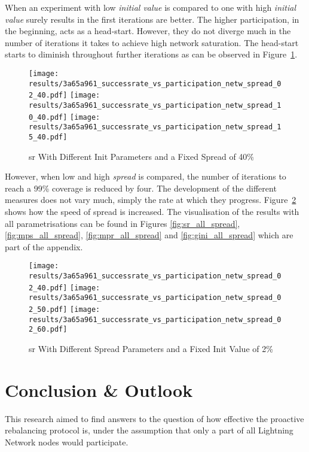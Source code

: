 \documentclass[final]{fhnwreport}       %
\begin{document}
When an experiment with low \emph{initial value} is compared to one with high \emph{initial value} surely results in the first iterations are better. The higher participation, in the beginning, acts as a head-start. However, they do not diverge much in the number of iterations it takes to achieve high network saturation. The head-start starts to diminish throughout further iterations as can be observed in Figure~\ref{fig:fix_spread}.

\begin{figure}[htp]
\centering
  \texttt{[image: results/3a65a961\_successrate\_vs\_participation\_netw\_spread\_02\_40.pdf]} 
  \texttt{[image: results/3a65a961\_successrate\_vs\_participation\_netw\_spread\_10\_40.pdf]} 
  \texttt{[image: results/3a65a961\_successrate\_vs\_participation\_netw\_spread\_15\_40.pdf]}
\caption{\gls{sr} With Different Init Parameters and a Fixed Spread of 40\%}
\label{fig:fix_spread}
\end{figure}

However, when low and high \emph{spread} is compared, the number of iterations to reach a 99\% coverage is reduced by four. The development of the different measures does not vary much, simply the rate at which they progress. Figure~\ref{fig:fix_init} shows how the speed of spread is increased. The visualisation of the results with all parametrisations can be found in Figures \ref{fig:sr_all_spread}, \ref{fig:mps_all_spread}, \ref{fig:mpr_all_spread} and \ref{fig:gini_all_spread} which are part of the appendix.


\newpage
\begin{figure}[htp]
\centering
  \texttt{[image: results/3a65a961\_successrate\_vs\_participation\_netw\_spread\_02\_40.pdf]} 
  \texttt{[image: results/3a65a961\_successrate\_vs\_participation\_netw\_spread\_02\_50.pdf]} 
  \texttt{[image: results/3a65a961\_successrate\_vs\_participation\_netw\_spread\_02\_60.pdf]}
\caption{\gls{sr} With Different Spread Parameters and a Fixed Init Value of 2\%}
\label{fig:fix_init}
\end{figure}

\newpage
\section{Conclusion \& Outlook}\label{sec:concl}
This research aimed to find answers to the question of how effective the proactive rebalancing protocol is, under the assumption that only a part of all Lightning Network nodes would participate. 
\end{document}
